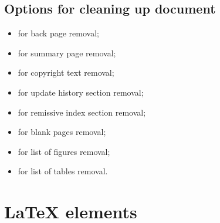\documentclass[report,english]{enacom}
\begin{document}
\subsection{Options for cleaning up document}
	\begin{itemize}
		\item {} for back page removal;
		\item {} for summary page removal;
		\item {} for copyright text removal;
		\item {} for update history section removal;
		\item {} for remissive index section removal;
		\item {} for blank pages removal;
		\item {} for list of figures removal;
		\item {} for list of tables removal.
	\end{itemize}


\section{LaTeX  elements}
\end{document}
